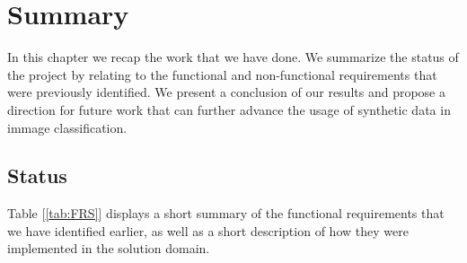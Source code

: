 \chapter{Summary}\label{ch:summary}

In this chapter we recap the work that we have done. We summarize the status of the project by relating to the functional and non-functional requirements that were previously identified. We present a conclusion of our results and propose a direction for future work that can further advance the usage of synthetic data in immage classification.

\section{Status}

Table [\ref{tab:FRS}] displays a short summary of the functional requirements that we have identified earlier, as well as a short description of how they were implemented in the solution domain.

